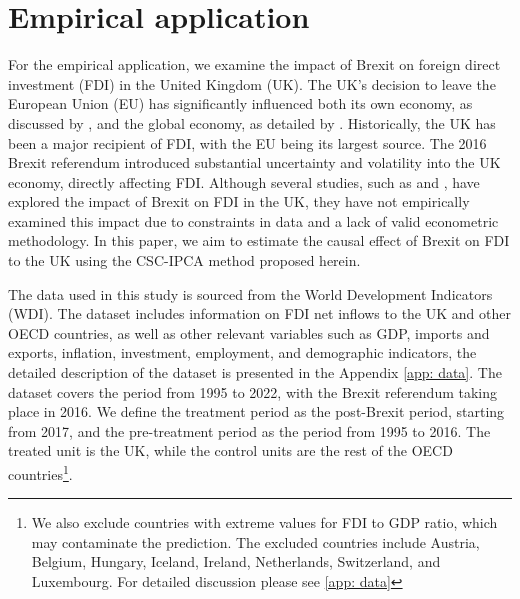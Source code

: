 \documentclass[12pt]{article}
\begin{document}
\section{Empirical application} 
\label{sec: application}
For the empirical application, we examine the impact of Brexit on foreign direct investment (FDI) in the United Kingdom (UK). The UK's decision to leave the European Union (EU) has significantly influenced both its own economy, as discussed by \cite{arnorsson2018causes}, and the global economy, as detailed by \cite{colantone2018global}. Historically, the UK has been a major recipient of FDI, with the EU being its largest source. The 2016 Brexit referendum introduced substantial uncertainty and volatility into the UK economy, directly affecting FDI. Although several studies, such as \cite{dhingra2016impact} and \cite{welfens2018brexit}, have explored the impact of Brexit on FDI in the UK, they have not empirically examined this impact due to constraints in data and a lack of valid econometric methodology. In this paper, we aim to estimate the causal effect of Brexit on FDI to the UK using the CSC-IPCA method proposed herein.

The data used in this study is sourced from the World Development Indicators (WDI). The dataset includes information on FDI net inflows to the UK and other OECD countries, as well as other relevant variables such as GDP, imports and exports, inflation, investment, employment, and demographic indicators, the detailed description of the dataset is presented in the Appendix \ref{app: data}. The dataset covers the period from 1995 to 2022, with the Brexit referendum taking place in 2016. We define the treatment period as the post-Brexit period, starting from 2017, and the pre-treatment period as the period from 1995 to 2016. The treated unit is the UK, while the control units are the rest of the OECD countries\footnote{We also exclude countries with extreme values for FDI to GDP ratio, which may contaminate the prediction. The excluded countries include  Austria, Belgium, Hungary, Iceland, Ireland, Netherlands, Switzerland, and  Luxembourg. For detailed discussion please see \ref{app: data}}.
\end{document}
